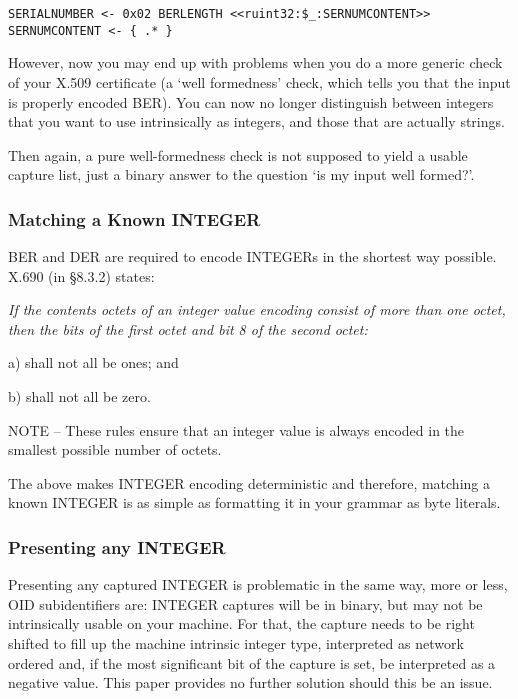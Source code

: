 \begin{changemargin}{-60mm}{0mm}
\begin{myquote}
\begin{verbatim}
SERIALNUMBER <- 0x02 BERLENGTH <<ruint32:$_:SERNUMCONTENT>>
SERNUMCONTENT <- { .* }
\end{verbatim}
\end{myquote}
\end{changemargin}

However, now you may end up with problems when you do a more generic check 
of your X.509 certificate (a ‘well formedness’ check, which tells you 
that the input is properly encoded BER). You can now no longer distinguish 
between integers that you want to use intrinsically as integers, and those 
that are actually strings.

Then again, a pure well-formedness check is not supposed to yield a usable 
capture list, just a binary answer to the question ‘is my input well 
formed?’.

\subsubsection{Matching a Known INTEGER}
\label{sec:work:ints:known}

BER and DER are required to encode INTEGERs in the shortest way possible. 
X.690 \cite{bib:x690} (in §8.3.2) states:

{\itshape
If the contents octets of an integer value encoding consist of more than 
one octet, then the bits of the first octet and bit 8 of the second octet:

a) shall not all be ones; and

b) shall not all be zero.

NOTE – These rules ensure that an integer value is always encoded in the 
smallest possible number of octets.
}

The above makes INTEGER encoding deterministic and therefore, matching a 
known INTEGER is as simple as formatting it in your grammar as byte 
literals.

\subsubsection{Presenting any INTEGER}
\label{sec:work:ints:presenting}

Presenting any captured INTEGER is problematic in the same way, more or 
less, OID subidentifiers are: INTEGER captures will be in binary, but may 
not be intrinsically usable on your machine. For that, the capture needs 
to be right shifted to fill up the machine intrinsic integer type, 
interpreted as network ordered and, if the most significant bit of the 
capture is set, be interpreted as a negative value. This paper provides no 
further solution should this be an issue.

